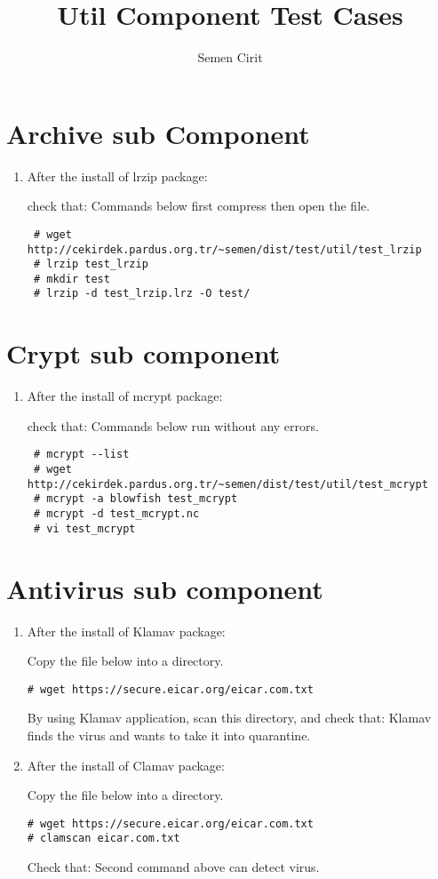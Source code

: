 \documentclass[a4paper,10pt]{article}
\title{Util Component Test Cases}
\author{Semen Cirit}
\begin{document}
\maketitle
\section{Archive sub Component}
\begin{enumerate}
 \item After the install of lrzip package:

check that: Commands below first compress then open the file.
\begin{verbatim}
 # wget http://cekirdek.pardus.org.tr/~semen/dist/test/util/test_lrzip
 # lrzip test_lrzip
 # mkdir test
 # lrzip -d test_lrzip.lrz -O test/
\end{verbatim}


\end{enumerate}


\section{Crypt sub component}
\begin{enumerate}
 \item After the install of mcrypt package:

check that: Commands below run without any errors.
\begin{verbatim}
 # mcrypt --list
 # wget http://cekirdek.pardus.org.tr/~semen/dist/test/util/test_mcrypt
 # mcrypt -a blowfish test_mcrypt
 # mcrypt -d test_mcrypt.nc
 # vi test_mcrypt
\end{verbatim}


\end{enumerate}


\section{Antivirus sub component}
\begin{enumerate}
\item After the install of Klamav package:

Copy the file below into a directory. 
\begin{verbatim}
# wget https://secure.eicar.org/eicar.com.txt
\end{verbatim}

By using Klamav application, scan this directory, and check that: Klamav finds the virus and wants to take it into quarantine.

\item After the install of Clamav package:

Copy the file below into a directory. 
\begin{verbatim}
# wget https://secure.eicar.org/eicar.com.txt
# clamscan eicar.com.txt
\end{verbatim}

Check that: Second command above can detect virus.

\end{enumerate}
\end{document}
